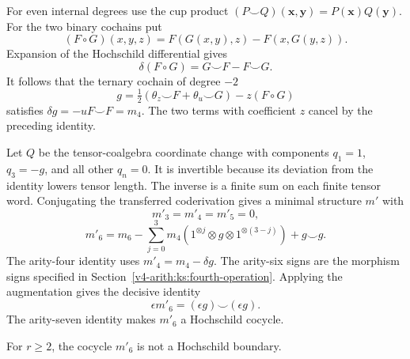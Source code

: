 For even internal degrees use the cup product
$(P\smile Q)(\mathbf x,\mathbf y)=P(\mathbf x)Q(\mathbf y)$.
For the two binary cochains put
\[
 (F\circ G)(x,y,z)=F(G(x,y),z)-F(x,G(y,z)).
\]
Expansion of the Hochschild differential gives
\[
 \delta(F\circ G)=G\smile F-F\smile G.
\]
It follows that the ternary cochain of degree $-2$
\begin{equation}\label{v4-arith:ks:fourth-primitive}
 g=\tfrac12(\theta_z\smile F+\theta_u\smile G)-z(F\circ G)
\end{equation}
satisfies $\delta g=-uF\smile F=m_4$.
The two terms with coefficient $z$ cancel by the preceding identity.

Let $Q$ be the tensor-coalgebra coordinate change with components
$q_1=1$, $q_3=-g$, and all other $q_n=0$.
It is invertible because its deviation from the identity lowers tensor length.
The inverse is a finite sum on each finite tensor word.
Conjugating the transferred coderivation gives a minimal structure $m'$ with
\[
 m'_3=m'_4=m'_5=0,
\]
\[
 m'_6=m_6-\sum_{j=0}^3
 m_4(1^{\otimes j}\otimes g\otimes1^{\otimes(3-j)})+g\smile g.
\]
The arity-four identity uses $m'_4=m_4-\delta g$.
The arity-six signs are the morphism signs specified in
Section~\ref{v4-arith:ks:fourth-operation}.
Applying the augmentation gives the decisive identity
\begin{equation}\label{v4-arith:ks:sixth-augmentation}
 \epsilon m'_6=(\epsilon g)\smile(\epsilon g).
\end{equation}
The arity-seven identity makes $m'_6$ a Hochschild cocycle.

\begin{lemma}
\label{v4-arith:ks:sixth-pairing}
\ClaimStatusProvedHere{}
For $r\geq2$, the cocycle $m'_6$ is not a Hochschild boundary.
\end{lemma}

